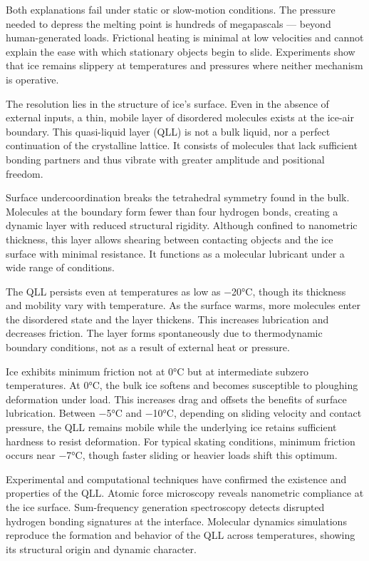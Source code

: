 Both explanations fail under static or slow-motion conditions. The pressure needed to depress the melting point is hundreds of megapascals — beyond human-generated loads. Frictional heating is minimal at low velocities and cannot explain the ease with which stationary objects begin to slide. Experiments show that ice remains slippery at temperatures and pressures where neither mechanism is operative.

The resolution lies in the structure of ice's surface. Even in the absence of external inputs, a thin, mobile layer of disordered molecules exists at the ice-air boundary. This quasi-liquid layer (QLL) is not a bulk liquid, nor a perfect continuation of the crystalline lattice. It consists of molecules that lack sufficient bonding partners and thus vibrate with greater amplitude and positional freedom.

Surface undercoordination breaks the tetrahedral symmetry found in the bulk. Molecules at the boundary form fewer than four hydrogen bonds, creating a dynamic layer with reduced structural rigidity. Although confined to nanometric thickness, this layer allows shearing between contacting objects and the ice surface with minimal resistance. It functions as a molecular lubricant under a wide range of conditions.

The QLL persists even at temperatures as low as −20°C, though its thickness and mobility vary with temperature. As the surface warms, more molecules enter the disordered state and the layer thickens. This increases lubrication and decreases friction. The layer forms spontaneously due to thermodynamic boundary conditions, not as a result of external heat or pressure.

Ice exhibits minimum friction not at 0°C but at intermediate subzero temperatures. At 0°C, the bulk ice softens and becomes susceptible to ploughing deformation under load. This increases drag and offsets the benefits of surface lubrication. Between −5°C and −10°C, depending on sliding velocity and contact pressure, the QLL remains mobile while the underlying ice retains sufficient hardness to resist deformation. For typical skating conditions, minimum friction occurs near −7°C, though faster sliding or heavier loads shift this optimum.

Experimental and computational techniques have confirmed the existence and properties of the QLL. Atomic force microscopy reveals nanometric compliance at the ice surface. Sum-frequency generation spectroscopy detects disrupted hydrogen bonding signatures at the interface. Molecular dynamics simulations reproduce the formation and behavior of the QLL across temperatures, showing its structural origin and dynamic character.

